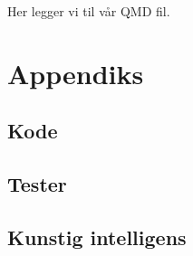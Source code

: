 \documentclass[
  12pt,
  a4paper,
  DIV=11,
  numbers=noendperiod]{scrartcl}
\begin{document}
Her legger vi til vår QMD fil.

\section*{Appendiks}\label{appendiks}

\subsection*{Kode}\label{kode}

\subsection*{Tester}\label{tester}

\subsection*{Kunstig intelligens}\label{kunstig-intelligens}
\end{document}
